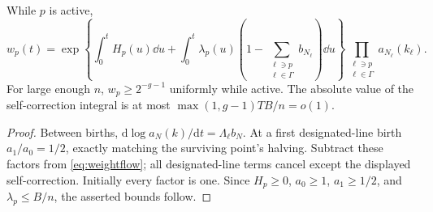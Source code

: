 \begin{lemma}\label{lem:product}
While \(p\) is active,
\begin{equation}\label{eq:product}
 w_p(t)=
 \exp\left\{\int_0^t H_p(u)\dd u+
 \int_0^t\lambda_p(u)\left(1-
       \sum_{\substack{\ell\ni p\\\ell\in\Gamma}}b_{N_\ell}\right)\dd u\right\}
 \prod_{\substack{\ell\ni p\\\ell\in\Gamma}}a_{N_\ell}(k_\ell).
\end{equation}
For large enough \(n\), \(w_p\ge2^{-g-1}\) uniformly while active.
The absolute value of the self-correction integral is at most
\(\max(1,g-1)TB/n=o(1)\).
\end{lemma}
\begin{proof}
Between births, \(\mathrm d\log a_N(k)/\mathrm dt=\Lambda_\ell b_N\).
At a first designated-line birth \(a_1/a_0=1/2\), exactly matching
the surviving point's halving. Subtract these factors from
\eqref{eq:weightflow}; all designated-line terms cancel except the
displayed self-correction. Initially every factor is one. Since
\(H_p\ge0\), \(a_0\ge1\), \(a_1\ge1/2\), and \(\lambda_p\le B/n\),
the asserted bounds follow.
\end{proof}

